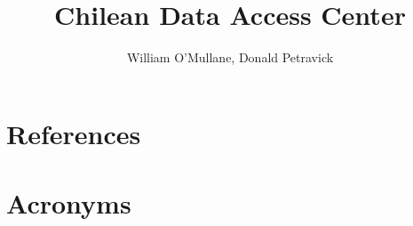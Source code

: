 \documentclass[DM,lsstdraft]{lsstdoc}
\title[Chilean DAC ]{ Chilean Data Access Center }
\author   {William O'Mullane, Donald Petravick}
\begin{document}
%
%
\maketitle

\renewcommand{\thepage}{\arabic{page}}%

\setcounter{page}{1}%
%
%


\section{References\label{sect:references}}
\renewcommand{\refname}{}


\section{Acronyms}
\end{document}
